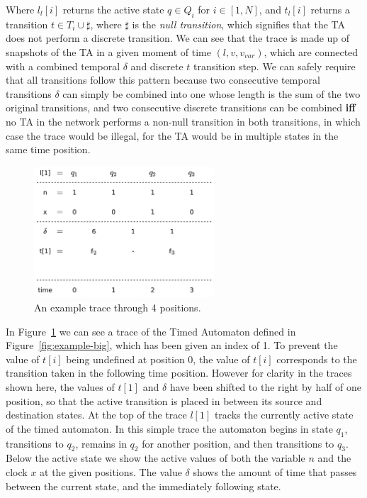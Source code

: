 \documentclass[a4paper,11pt]{report}
\theoremstyle{definition}
\begin{document}
Where $l_{l}[i]$ returns the active state $q \in Q_{i}$ for $i \in [1,N]$, and
$t_{l}[i]$ returns a transition $t \in T_{i} \cup \sharp$, where $\sharp$ is the
\emph{null transition}, which signifies that the TA does not perform a discrete
transition. We can see that the trace is made up of snapshots of the TA in a
given moment of time $(l,v,v_{var})$, which are connected with a combined
temporal $\delta$ and discrete $t$ transition step. We can safely require that
all transitions follow this pattern because two consecutive temporal transitions
$\delta$ can simply be combined into one whose length is the sum of the two
original transitions, and two consecutive discrete transitions can be combined
\textbf{iff} no TA in the network performs a non-null transition in both
transitions, in which case the trace would be illegal, for the TA would be in
multiple states in the same time position.

\begin{figure}[h]
  \centering
  \includegraphics[width=0.6\textwidth]{trace-shift-min}
  \caption{An example trace through 4 positions.}
  \label{fig:trace-min}
\end{figure}

In Figure~\ref{fig:trace-min} we can see a trace of the Timed Automaton defined
in Figure~\ref{fig:example-big}, which has been given an index of 1. To prevent
the value of $t[i]$ being undefined at position $0$, the value of $t[i]$
corresponds to the transition taken in the following time position. However for
clarity in the traces shown here, the values of $t[1]$ and $\delta$ have been
shifted to the right by half of one position, so that the active transition is
placed in between its source and destination states. At the top of the trace
$l[1]$ tracks the currently active state of the timed automaton. In this simple
trace the automaton begins in state $q_{1}$, transitions to $q_{2}$, remains in
$q_{2}$ for another position, and then transitions to $q_{3}$. Below the active
state we show the active values of both the variable $n$ and the clock $x$ at
the given positions. The value $\delta$ shows the amount of time that passes
between the current state, and the immediately following state.
\end{document}
